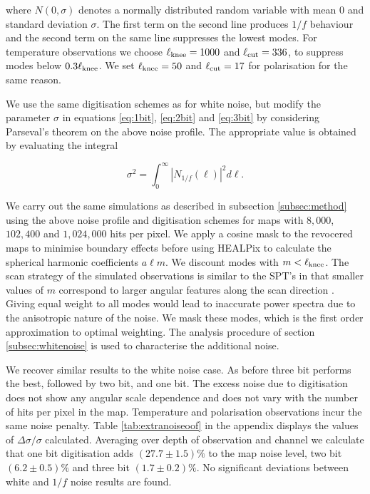 \documentclass[apj]{emulateapj}
\newcommand{\lknee}{\ensuremath{\ell_{\rm knee}}}
\newcommand{\lcut}{\ensuremath{\ell_{\rm cut}}}
\begin{document}
where $N\left(0, \sigma \right)$ denotes a normally distributed random variable with mean $0$ and standard deviation $\sigma$. The first term on the second line produces $1/f$ behaviour and the second term on the same line suppresses the lowest modes. For temperature observations we choose $\lknee = 1000$ and $\lcut = 336$, to suppress modes below $0.3 \lknee$. We set $\lknee = 50$ and $\lcut = 17$ for polarisation for the same reason.

We use the same digitisation schemes as for white noise, but modify the parameter $\sigma$ in equations \ref{eq:1bit}, \ref{eq:2bit} and \ref{eq:3bit} by considering Parseval's theorem on the above noise profile. The appropriate value is obtained by evaluating the integral

\begin{equation}
\sigma^2 = \int_0^\infty \left| N_{1/f}(\ell) \right|^2 d\ell.
\end{equation}

We carry out the same simulations as described in subsection \ref{subsec:method} using the above noise profile and digitisation schemes for maps with $8,000$, $102,400$ and $1,024,000$ hits per pixel. We apply a cosine mask to the revocered maps to minimise boundary effects before using HEALPix to calculate the spherical harmonic coefficients $a\ell m$. We discount modes with $m < \lknee$. The scan strategy of the simulated observations is similar to the SPT's in that smaller values of $m$ correspond to larger angular features along the scan direction \citep{chown2018}. Giving equal weight to all modes would lead to inaccurate power spectra due to the anisotropic nature of the noise. We mask these modes, which is the first order approximation to optimal weighting. The analysis procedure of section \ref{subsec:whitenoise} is used to characterise the additional noise.

We recover similar results to the white noise case. As before three bit performs the best, followed by two bit, and one bit. The excess noise due to digitisation does not show any angular scale dependence and does not vary with the number of hits per pixel in the map. Temperature and polarisation observations incur the same noise penalty. Table \ref{tab:extranoiseoof} in the appendix displays the values of $\Delta \sigma / \sigma$ calculated. Averaging over depth of observation and channel we calculate that one bit digitisation adds $(27.7\pm 1.5)\%$ to the map noise level, two bit $(6.2\pm0.5)\%$ and three bit $(1.7\pm0.2)\%$. No significant deviations between white and $1/f$ noise results are found.
\end{document}
